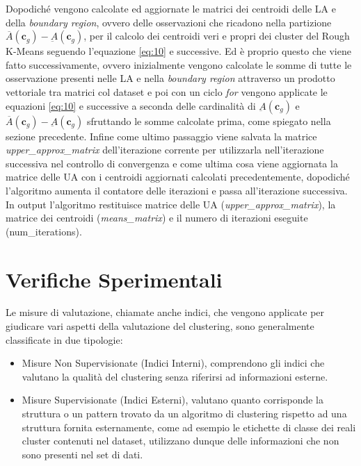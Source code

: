 \documentclass[12pt]{article}
\begin{document}


Dopodiché vengono calcolate ed aggiornate le matrici dei centroidi delle LA e della \textit{boundary region}, ovvero delle osservazioni che ricadono nella partizione $\overline{A}(\mathbf{c}_{g})-\underbar{A}(\mathbf{c}_g)$, per il calcolo dei centroidi veri e propri dei cluster del Rough K-Means seguendo l'equazione \ref{eq:10} e successive. Ed è proprio questo che viene fatto successivamente, ovvero inizialmente vengono calcolate le somme di tutte le osservazione presenti nelle LA e nella \textit{boundary region} attraverso un prodotto vettoriale tra matrici col dataset e poi con un ciclo \textit{for} vengono applicate le equazioni \ref{eq:10} e successive a seconda delle cardinalità di $\underbar{A}(\mathbf{c}_g)$ e $\overline{A}(\mathbf{c}_{g})-\underbar{A}(\mathbf{c}_g)$ sfruttando le somme calcolate prima, come spiegato nella sezione precedente. Infine come ultimo passaggio viene salvata la matrice \textit{upper\_approx\_matrix} dell'iterazione corrente per utilizzarla nell'iterazione successiva nel controllo di convergenza e come ultima cosa viene aggiornata la matrice delle UA con i centroidi aggiornati calcolati precedentemente, dopodiché l'algoritmo aumenta il contatore delle iterazioni e passa all'iterazione successiva. In output l'algoritmo restituisce matrice delle UA (\textit{upper\_approx\_matrix}), la matrice dei centroidi (\textit{means\_matrix}) e il numero di iterazioni eseguite (num\_iterations).

\section{Verifiche Sperimentali}

Le misure di valutazione, chiamate anche indici, che vengono applicate per giudicare vari aspetti della valutazione del clustering, sono generalmente classificate in due tipologie:

\begin{itemize}
	\item Misure Non Supervisionate (Indici Interni), comprendono gli indici che valutano la qualità del clustering senza riferirsi ad informazioni esterne.
	
	\item Misure Supervisionate (Indici Esterni), valutano quanto corrisponde la struttura o un pattern trovato da un algoritmo di clustering rispetto ad una struttura fornita esternamente, come ad esempio le etichette di classe dei reali cluster contenuti nel dataset, utilizzano dunque delle informazioni che non sono presenti nel set di dati. 
\end{itemize}
\end{document}
